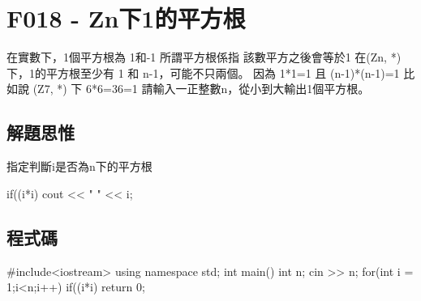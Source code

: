 \section{F018 - Zn下1的平方根}
在實數下，1個平方根為 1和-1 所謂平方根係指 該數平方之後會等於1 在(Zn, *)下，1的平方根至少有 1 和 n-1，可能不只兩個。 因為 1*1=1 且 (n-1)*(n-1)=1 比如說 (Z7, *) 下 6*6=36=1 請輸入一正整數n，從小到大輸出1個平方根。
\subsection{解題思惟}
指定判斷i是否為n下的平方根
\begin{inside}
	if((i*i)%
	cout << " " << i;
\end{inside}
\subsection{程式碼}
\begin{cppcode}
#include<iostream>
using namespace std;
int main()
{
	int n;
	cin >> n;
	for(int i = 1;i<n;i++) {
		if((i*i)%
	}
	return 0;
}
\end{cppcode}
